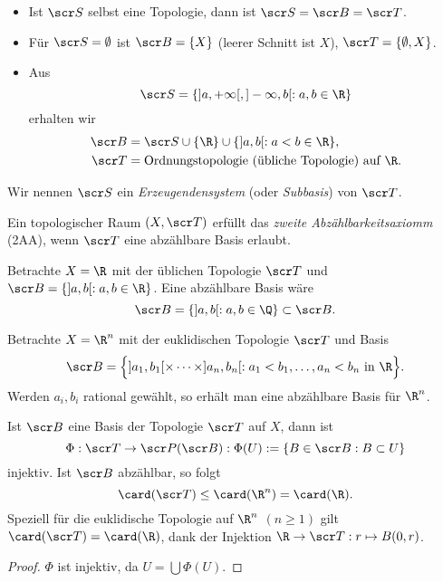 \begin{ex}
	\begin{itemize}
		\item
			Ist $\scr S$ selbst eine Topologie, dann ist $\scr S = \scr B = \scr T$.
		\item
			Für $\scr S = \emptyset$ ist $\scr B = \{X\}$ (leerer Schnitt ist $X$), $\scr T = \{\emptyset, X \}$.
		\item
			Aus
			\[
				\scr S = \{ ]a,+\infty[, ]-\infty, b[ : a,b \in \R \}
			\]
			erhalten wir
			\begin{align*}
				\scr B &= \scr S \cup \{\R \}  \cup \{ ]a,b[ : a < b \in \R \}, \\
				\scr T &= \text{Ordnungstopologie (übliche Topologie) auf $\R$}.
			\end{align*}
	\end{itemize}
\end{ex}

\begin{conv}
	Wir nennen $\scr S$ ein \emph{Erzeugendensystem} (oder \emph{Subbasis}) von $\scr T$.
\end{conv}

\begin{df}
	Ein topologischer Raum $(X, \scr T)$ erfüllt das \emph{zweite Abzählbarkeitsaxiomm} (2AA), wenn $\scr  T$ eine abzählbare Basis erlaubt.
\end{df}

\begin{ex}
	Betrachte $X = \R$ mit der üblichen Topologie $\scr T$ und $\scr B = \{ ]a,b[ : a,b \in \R \}$.
	Eine abzählbare Basis wäre
	\[
		\scr B = \{ ]a,b[ : a,b \in \Q \} \subset \scr B.
	\]
\end{ex}

\begin{ex}
	Betrachte $X = \R^n$ mit der euklidischen Topologie $\scr T$ und Basis
	\[
		\scr B = \Big\{ ]a_1,b_1[ \times \dotsb \times ]a_n,b_n[ : a_1 < b_1, \dotsc, a_n < b_n \text{ in $\R$} \Big\}.
	\]
	Werden $a_i, b_i$ rational gewählt, so erhält man eine abzählbare Basis für $\R^n$.
\end{ex}

\begin{st}
	Ist $\scr B$ eine Basis der Topologie $\scr T$ auf $X$, dann ist
	\[
		\Phi
		: \scr T \to \scr P (\scr B)
		: \Phi(U) := \{ B \in \scr B : B \subset U \}
	\]
	injektiv.
	Ist $\scr B$ abzählbar, so folgt
	\[
		\card(\scr T) \le \card(\R^n) = \card(\R).
	\]
	Speziell für die euklidische Topologie auf $\R^n$ $(n \ge 1)$ gilt $\card(\scr T) = \card(\R)$, dank der Injektion $\R \to \scr T : r \mapsto B(0,r)$.
	\begin{proof}
		$\Phi$ ist injektiv, da $U = \bigcup \Phi(U)$.
	\end{proof}
\end{st}

